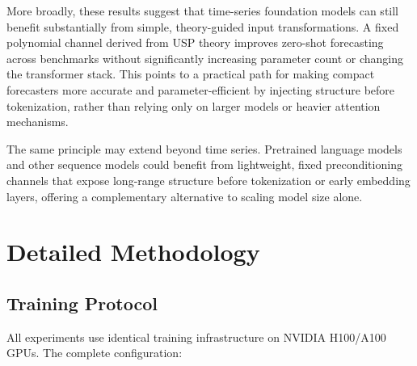 \documentclass{article}
\begin{document}
More broadly, these results suggest that time-series foundation models can still benefit substantially from simple, theory-guided input transformations. A fixed polynomial channel derived from USP theory improves zero-shot forecasting across benchmarks without significantly increasing parameter count or changing the transformer stack. This points to a practical path for making compact forecasters more accurate and parameter-efficient by injecting structure before tokenization, rather than relying only on larger models or heavier attention mechanisms.

The same principle may extend beyond time series. Pretrained language models and other sequence models could benefit from lightweight, fixed preconditioning channels that expose long-range structure before tokenization or early embedding layers, offering a complementary alternative to scaling model size alone.





\newpage
\appendix
\onecolumn

\section{Detailed Methodology}
\label{app:methodology}

\subsection{Training Protocol}

All experiments use identical training infrastructure on NVIDIA H100/A100 GPUs. The complete configuration:
\end{document}
